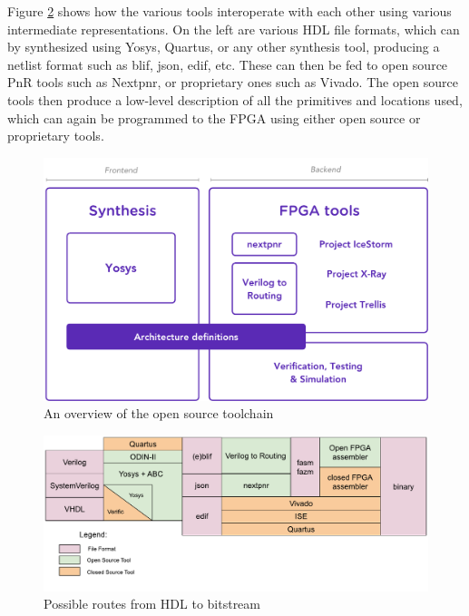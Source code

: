 \documentclass{article}
\begin{document}
Figure \ref{fig:symbiflow2} shows how the various tools interoperate with each other using various intermediate representations. On the left are various HDL file formats, which can by synthesized using Yosys, Quartus, or any other synthesis tool, producing a netlist format such as blif, json, edif, etc. These can then be fed to open source PnR tools such as Nextpnr, or proprietary ones such as Vivado. The open source tools then produce a low-level description of all the primitives and locations used, which can again be programmed to the FPGA using either open source or proprietary tools.

\begin{figure}
    \centering
    \includegraphics[width=\textwidth]{fig/parts.pdf}
    \caption{An overview of the open source toolchain \cite{symbiflow}}
    \label{fig:symbiflow}
\end{figure}

\begin{figure}
    \centering
    \includegraphics[width=\textwidth]{fig/toolchain-flow.pdf}
    \caption{Possible routes from HDL to bitstream \cite{symbiflow}}
    \label{fig:symbiflow2}
\end{figure}
\end{document}
